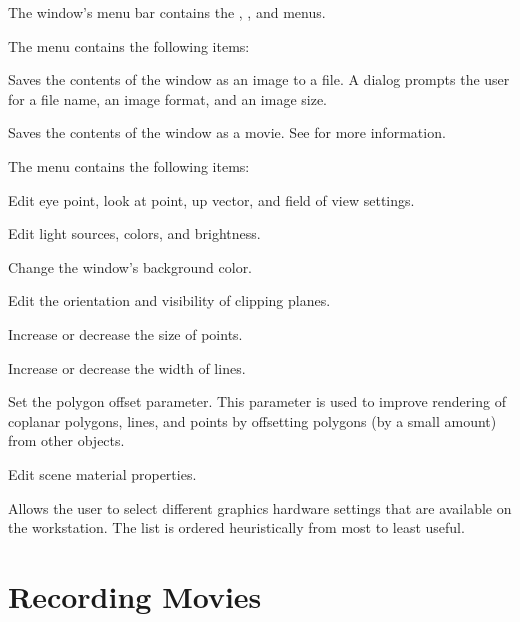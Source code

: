The \viewer{} window's menu bar contains the , ,
and  menus.

\begin{description}
   The  menu contains the following items:

  \begin{description}
     Saves the contents of the \viewer{}
    window as an image to a file.  A dialog prompts the user for a
    file name, an image format, and an image size.
    
     Saves the contents of the \viewer{}
    window as a movie.  See  for more information.
  \end{description}
  
   The  menu contains the following items:
  \begin{description}
     Edit eye point, look
    at point, up vector, and field of view settings.

     Edit light sources,
    colors, and brightness.

     Change the \viewer{}
    window's background color.

     Edit the orientation and visibility
    of clipping planes.

     Increase or decrease the size of points.

     Increase or decrease the width of lines.
    
     Set the polygon offset parameter.
    This parameter is used to improve rendering of coplanar
    polygons, lines, and points by offsetting polygons (by a small
    amount) from other objects.

     Edit scene material properties.
  \end{description}

   Allows the user to select different
  graphics hardware settings that are available on the workstation.
  The list is ordered heuristically from most to least useful.
\end{description}

\section{Recording Movies}
\label{sec:recordmovies} 

